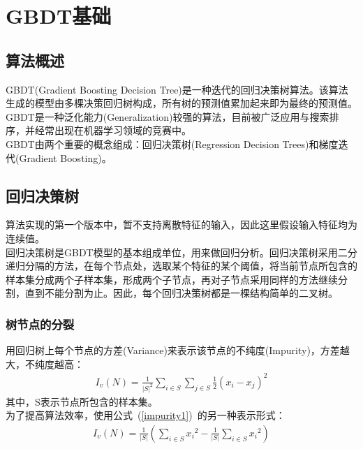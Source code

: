 \documentclass[a4paper,11pt,         %
               ]{article}
\begin{document}
\section{GBDT基础}

\subsection{算法概述}

GBDT(Gradient Boosting Decision Tree)是一种迭代的回归决策树算法。该算法生成的模型由多棵决策回归树构成，所有树的预测值累加起来即为最终的预测值。GBDT是一种泛化能力(Generalization)较强的算法，目前被广泛应用与搜索排序，并经常出现在机器学习领域的竞赛中。\\

GBDT由两个重要的概念组成：回归决策树(Regression Decision Trees)和梯度迭代(Gradient Boosting)。

\subsection{回归决策树}

算法实现的第一个版本中，暂不支持离散特征的输入，因此这里假设输入特征均为连续值。\\

回归决策树是GBDT模型的基本组成单位，用来做回归分析。回归决策树采用二分递归分隔的方法，在每个节点处，选取某个特征的某个阈值，将当前节点所包含的样本集分成两个子样本集，形成两个子节点，再对子节点采用同样的方法继续分割，直到不能分割为止。因此，每个回归决策树都是一棵结构简单的二叉树。

\subsubsection{树节点的分裂}

用回归树上每个节点的方差(Variance)来表示该节点的不纯度(Impurity)，方差越大，不纯度越高：
\begin{eqnarray}
	\label{impurity1}
{I}_{v}(N)=\frac{1}{{\left|S \right|}^{2}}\sum_{i\in S}\sum_{j\in S}\frac{1}{2}(x_{i}-x_{j})^2
\end{eqnarray}
其中，S表示节点所包含的样本集。\\

为了提高算法效率，使用公式~(\ref{impurity1})~的另一种表示形式：
\begin{eqnarray}
	\label{impurity2}
{I}_{v}(N)=\frac{1}{\left | S \right |}\left ( \sum_{i\in S} {x_{i}}^2 - \frac{1}{\left | S \right |} \sum_{i \in S} {x_{i}}^2 \right )
\end{eqnarray}
\\
\end{document}

